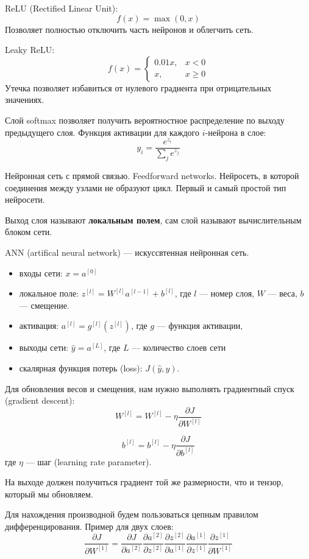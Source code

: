 ReLU (Rectified Linear Unit):
\[
    f(x) = \max(0, x)
\]
Позволяет полностью отключить часть нейронов и облегчить сеть.

Leaky ReLU:
\[
    f(x) =
    \begin{cases}
        0.01 x, & x < 0 \\
        x,      & x \geq 0
    \end{cases}
\]
Утечка позволяет избавиться от нулевого градиента при отрицательных значениях.

Слой softmax позволяет получить вероятностное распределение по выходу
предыдущего слоя. Функция активации для каждого $i$-нейрона в слое:
\[
    y_i = \frac{e^{z_i}}{\sum_j e^{z_j}}
\]

Нейронная сеть с прямой связью. Feedforward networks. Нейросеть, в которой
соединения между узлами не образуют цикл. Первый и самый простой тип нейросети.

Выход слоя называют \textbf{локальным полем}, сам слой называют вычислительным
блоком сети.

ANN (artifical neural network) --- искуссвтенная нейронная сеть.

\begin{itemize}
    \item входы сети: $x = a^{[0]}$

    \item локальное поле: $z^{[l]} = W^{[l]} a^{[l-1]} + b^{[l]}$, где $l$ ---
        номер слоя, $W$ --- веса, $b$ --- смещение.

    \item активация: $a^{[l]} = g^{[l]}(z^{[l]})$, где $g$ --- функция
        активации,

    \item выходы сети: $\hat y = a^{[L]}$, где $L$ --- количество слоев сети

    \item скалярная функция потерь (loss): $J(\hat y, y)$.
\end{itemize}

Для обновления весов и смещения, нам нужно выполнять градиентный спуск
(gradient descent):
\[
    W^{[l]} = W^{[l]} - \eta\frac{\partial J}{\partial W^{[l]}}
\]

\[
    b^{[l]} = b^{[l]} - \eta\frac{\partial J}{\partial b^{[l]}}
\]
где $\eta$ --- шаг (learning rate parameter).

На выходе должен получиться градиент той же размерности, что и тензор, который
мы обновляем.

Для нахождения производной будем пользоваться цепным правилом
дифференцирования. Пример для двух слоев:
\[
    \frac{\partial J}{\partial W^{[1]}}
    = \frac{\partial J}{\partial a^{[2]}}
    \frac{\partial a^{[2]}}{\partial z^{[2]}}
    \frac{\partial z^{[2]}}{\partial a^{[1]}}
    \frac{\partial a^{[1]}}{\partial z^{[1]}}
    \frac{\partial z^{[1]}}{\partial W^{[1]}}
\]

